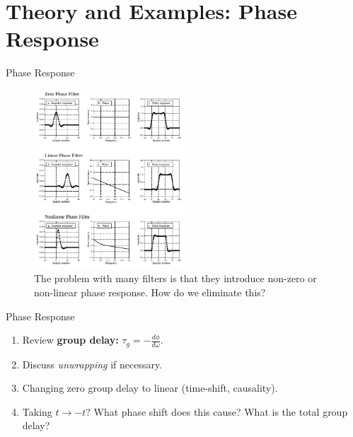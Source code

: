\documentclass{beamer}
\begin{document}
\section{Theory and Examples: Phase Response}

\begin{frame}{Phase Response}
\small
\begin{figure}
\centering
\includegraphics[width=0.5\textwidth]{figures/phase.png}
\caption{\label{fig:phase} The problem with many filters is that they introduce non-zero or non-linear phase response.  How do we eliminate this?}
\end{figure}
\end{frame}

\begin{frame}{Phase Response}
\begin{enumerate}
\item Review \textbf{group delay:} $\tau_g = - \frac{d\phi}{d\omega}$.
\item Discuss \textit{unwrapping} if necessary.
\item Changing zero group delay to linear (time-shift, causality).
\item Taking $t \rightarrow -t$? What phase shift does this cause?  What is the total group delay?
\end{enumerate}
\end{frame}
\end{document}
